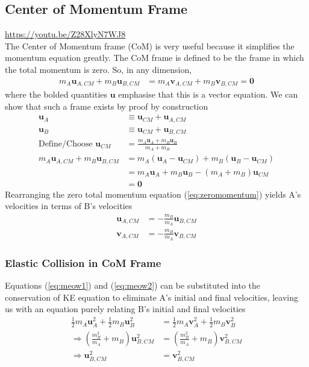 \documentclass{article}
\begin{document}
\subsection{Center of Momentum Frame}
\url{https://youtu.be/Z28XlyN7WJ8}\\
The Center of Momentum frame (CoM) is very useful because it simplifies the momentum equation greatly. The CoM frame is defined to be the frame in which the total momentum is zero. So, in any dimension,
\begin{align}
    m_A \mathbf{u}_{A,CM} + m_B \mathbf{u}_{B,CM} &= m_A \mathbf{v}_{A,CM} + m_B \mathbf{v}_{B,CM} = \mathbf{0} \label{eq:zeromomentum}
\end{align}
where the bolded quantities $\mathbf{u}$ emphasise that this is a vector equation. We can show that such a frame exists by proof by construction 
\begin{align}
    \mathbf{u}_A &\equiv \mathbf{u}_{CM} + \mathbf{u}_{A,CM} \\
    \mathbf{u}_B &\equiv \mathbf{u}_{CM} + \mathbf{u}_{B,CM} \\
    \text{Define/Choose }\mathbf{u}_{CM} &= \frac{m_A \mathbf{u}_A + m_B \mathbf{u}_B}{m_A + m_B} \\
    m_A \mathbf{u}_{A,CM} + m_B \mathbf{u}_{B,CM} &= m_A (\mathbf{u}_A  - \mathbf{u}_{CM}) + m_B (\mathbf{u}_B - \mathbf{u}_{CM}) \\
    &= m_A \mathbf{u}_A + m_B \mathbf{u}_B - (m_A + m_B) \mathbf{u}_{CM} \\
    &= \mathbf{0}
\end{align}
Rearranging the zero total momentum equation (\ref{eq:zeromomentum}) yields A's velocities in terms of B's velocities
\begin{align}
    \mathbf{u}_{A,CM} &= -\frac{m_B}{m_A} \mathbf{u}_{B,CM} \label{eq:meow1}\\
    \mathbf{v}_{A,CM} &= -\frac{m_B}{m_A} \mathbf{v}_{B,CM} \label{eq:meow2}
\end{align}

\subsubsection{Elastic Collision in CoM Frame}
Equations (\ref{eq:meow1}) and (\ref{eq:meow2}) can be substituted into the conservation of KE equation to eliminate A's initial and final velocities, leaving us with an equation purely relating B's initial and final velocities
\begin{align}
    \frac{1}{2} m_A \mathbf{u}_{A}^2 + \frac{1}{2} m_B \mathbf{u}_{B}^2  &= \frac{1}{2} m_A \mathbf{v}_{A}^2 + \frac{1}{2} m_B \mathbf{v}_{B}^2 \\
    \Rightarrow \left( \frac{m_B^2}{m_A} + m_B \right) \mathbf{u}_{B,CM}^2 &= \left( \frac{m_B^2}{m_A} + m_B \right) \mathbf{v}_{B,CM}^2 \\
    \Rightarrow \mathbf{u}_{B,CM}^2 &= \mathbf{v}_{B,CM}^2 
\end{align}
\end{document}
